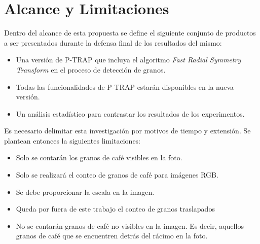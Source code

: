 \section{\textbf{Alcance y Limitaciones}}\label{alcance}
Dentro del alcance de esta propuesta se define el siguiente conjunto de productos a ser presentados durante la defensa final de los resultados del mismo:
\begin{itemize}
\item Una versi\'on de P-TRAP\cite{ptrap} que incluya el algoritmo \textit{Fast Radial Symmetry Transform}\cite{loyzelinsky} en el proceso de detecci\'on de granos.
\item Todas las funcionalidades de P-TRAP\cite{ptrap} estar\'an disponibles en la nueva versi\'on.
\item Un an\'alisis estad\'istico para contrastar los resultados de los experimentos.\\
\end{itemize}
Es necesario delimitar esta investigaci\'on por motivos de tiempo y extensi\'on. Se plantean entonces la siguientes limitaciones:
\begin{itemize}
\item Solo se contar\'an los granos de caf\'e visibles en la foto. 
\item Solo se realizar\'a el conteo de granos de caf\'e para im\'agenes RGB.
\item Se debe proporcionar la escala en la imagen.
\item Queda por fuera de este trabajo el conteo de granos traslapados 
\item No se contar\'an granos de caf\'e no visibles en la imagen. Es decir, aquellos granos de caf\'e que se encuentren detr\'as del r\'acimo en la foto.
\end{itemize}